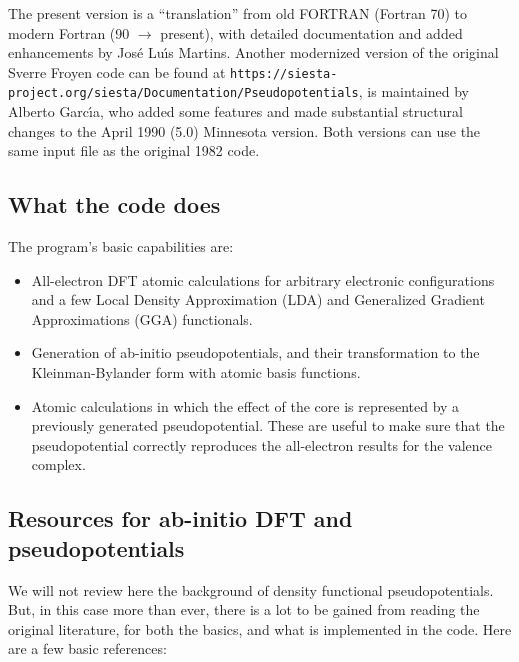 \documentclass[11pt]{article}
\begin{document}
The present version is a ``translation'' from old FORTRAN (Fortran 70) to modern Fortran (90 $\rightarrow$ present),
with detailed documentation and added enhancements by Jos\'e Lu\'{\i}s Martins.
Another modernized version of the original Sverre Froyen code can be found at
\texttt{https://siesta-project.org/siesta/Documentation/Pseudopotentials},
is maintained by Alberto Garc\'{\i}a, who added some features and made substantial
structural changes to the April 1990 (5.0) Minnesota version.
Both versions can use the same input file as the original 1982 code.

\subsection{What the code does}
\label{sec:capabilities}

The program's basic capabilities are:

\begin{itemize}
\item All-electron DFT atomic calculations for arbitrary electronic
configurations and a few Local Density Approximation (LDA) and
Generalized Gradient Approximations (GGA) functionals.

\item Generation of ab-initio pseudopotentials, and their transformation
to the Kleinman-Bylander form with atomic basis functions.

\item Atomic calculations in which the effect of the core is represented
by a previously generated pseudopotential. These are useful to make
sure that the pseudopotential correctly reproduces the all-electron
results for the valence complex.

\end{itemize}

\subsection{Resources for ab-initio DFT and pseudopotentials}
\label{sec:primer}

We will not review here the background of density functional pseudopotentials.
But, in this case more than ever,
there is a lot to be gained from reading the original literature,
for both the basics, and what is implemented in the code.
Here are a few basic references:
\end{document}
